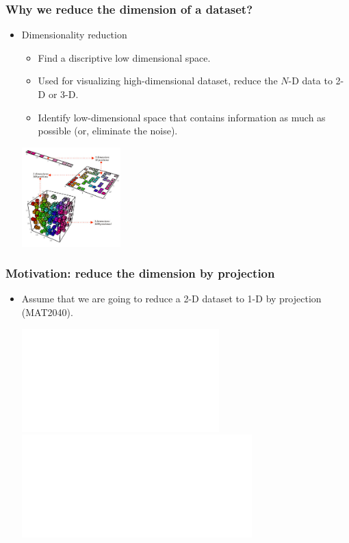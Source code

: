 \documentclass[serif]{beamer}
\begin{document}
\begin{frame}
    \frametitle{Why we reduce the dimension of a dataset?}
    \begin{itemize}
        \item Dimensionality reduction
        \begin{itemize}
            \item Find a \alert{discriptive} low dimensional space.
            \item Used for visualizing high-dimensional dataset, reduce the $N$-D data to 2-D or 3-D.
            \item Identify low-dimensional space that contains \alert{information} as much as possible (or, eliminate the noise).
        \end{itemize}
        
        \begin{center}
            \includegraphics[width=1.5in]{dimreduct.png}
        \end{center}
    \end{itemize}
\end{frame}

\begin{frame}
    \frametitle{Motivation: reduce the dimension by projection}
    \begin{itemize}
        \item Assume that we are going to reduce a 2-D dataset to 1-D by \alert{projection} (MAT2040).
        \begin{center}
            \includegraphics<1>[width=3in]{./proj0.pdf}
            \includegraphics<2>[width=3.5in]{./proj12.pdf}
        \end{center}
    \end{itemize}
\end{frame}
\end{document}
